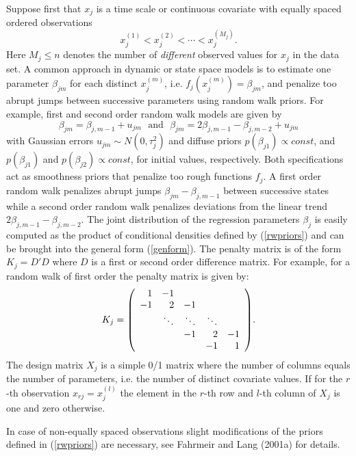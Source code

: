 \documentclass[11pt,a4paper,twoside]{bayesxarticle}
\begin{document}
Suppose first that $x_j$ is a time scale or continuous covariate
with equally spaced ordered observations
$$
x_j^{(1)} < x_j^{(2)} < \cdots < x_j^{(M_j)}.
$$
Here $M_j \leq n$ denotes the number of {\em different} observed
values for $x_j$ in the data set. A common approach in dynamic or
state space models is to estimate one parameter $\beta_{jm}$ for
each distinct $x_j^{(m)}$, i.e. $f_j(x_j^{(m)}) = \beta_{jm}$, and
penalize too abrupt jumps between successive parameters using random
walk priors. For example, first and second order random walk models
are given by
\begin{equation}
\label{rwpriors}
\beta_{jm}=\beta_{j,m-1}+u_{jm}\,\,\,\,\mbox{and}\,\,\,\,\beta_{jm}=2\beta_{j,m-1}-\beta_{j,m-2}+u_{jm}
\end{equation}
with Gaussian errors $u_{jm}\sim N(0,\tau_j^{2})$ and diffuse priors
$p(\beta_{j1})\propto const$, and $p(\beta_{j1})$ and
$p(\beta_{j2})\propto const$, for initial values, respectively. Both
specifications act as smoothness priors that penalize too rough
functions $f_j$. A first order random walk penalizes abrupt jumps
$\beta_{jm}-\beta_{j,m-1}$ between successive states while a second
order random walk penalizes deviations from the linear trend $2
\beta_{j,m-1}-\beta_{j,m-2}$. The joint distribution of the
regression parameters $\beta_j$ is easily computed as the product of
conditional densities defined by (\ref{rwpriors}) and can be brought
into the general form (\ref{genform}). The penalty matrix is of the
form $K_j=D'D$ where $D$ is a first or second order difference
matrix. For example, for a random walk of first order the penalty
matrix is given by:
$$
K_j = {\footnotesize \left(
\begin{array}{rrrrr}
 1 & -1 & & &  \\
-1 & 2 & -1 & & \\
 &  \ddots & \ddots & \ddots &  \\
 & & -1 & 2 & -1 \\
  & & & -1 & 1
\end{array}
\right) }.
$$
The design matrix $X_j$ is a simple 0/1 matrix where the number of
columns equals the number of parameters, i.e. the number of distinct
covariate values. If for the $r$-th observation $x_{rj}=x_j^{(l)}$
the element in the $r$-th row and $l$-th column of $X_j$ is one and
zero otherwise.

In case of non-equally spaced observations slight modifications of
the priors defined in (\ref{rwpriors}) are necessary, see Fahrmeir
and Lang (2001a) for details.
\end{document}
